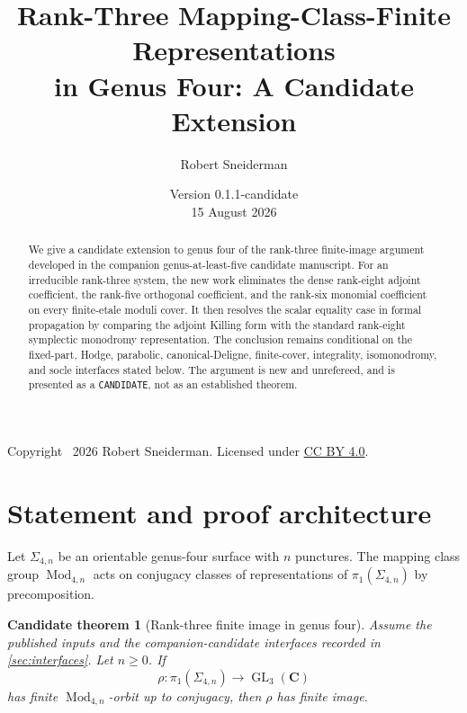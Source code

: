 \documentclass[11pt]{article}
\title{Rank-Three Mapping-Class-Finite Representations\\
in Genus Four: A Candidate Extension}
\author{Robert Sneiderman}
\date{Version 0.1.1-candidate\\15 August 2026}
\newtheorem{candidate}[theorem]{Candidate theorem}
\theoremstyle{definition}
\newcommand{\C}{\mathbf C}
\newcommand{\Mod}{\operatorname{Mod}}
\newcommand{\GL}{\operatorname{GL}}
\begin{document}
\maketitle

\begin{abstract}
We give a candidate extension to genus four of the rank-three
finite-image argument developed in the companion genus-at-least-five
candidate manuscript.  For an irreducible rank-three system, the new work
eliminates the dense rank-eight adjoint coefficient, the rank-five
orthogonal coefficient, and the rank-six monomial coefficient on every
finite-etale moduli cover.  It then resolves the scalar equality case in
formal propagation by comparing the adjoint Killing form with the standard
rank-eight symplectic monodromy representation.  The conclusion remains
conditional on the fixed-part, Hodge, parabolic, canonical-Deligne,
finite-cover, integrality, isomonodromy, and socle interfaces stated below.
The argument is new and unrefereed, and is presented as a
\texttt{CANDIDATE}, not as an established theorem.
\end{abstract}

\begin{center}
\end{center}

\begin{center}
\small Copyright \textcopyright\ 2026 Robert Sneiderman.  Licensed under
\href{https://creativecommons.org/licenses/by/4.0/}{CC BY 4.0}.
\end{center}

\tableofcontents

\section{Statement and proof architecture}\label{sec:statement}

Let $\Sigma_{4,n}$ be an orientable genus-four surface with $n$ punctures.
The mapping class group $\Mod_{4,n}$ acts on conjugacy classes of
representations of $\pi_1(\Sigma_{4,n})$ by precomposition.

\begin{candidate}[Rank-three finite image in genus four]\label{cand:main}
Assume the published inputs and the companion-candidate interfaces recorded
in \cref{sec:interfaces}.  Let $n\ge0$.  If
\[
 \rho:\pi_1(\Sigma_{4,n})\longrightarrow\GL_3(\C)
\]
has finite $\Mod_{4,n}$-orbit up to conjugacy, then $\rho$ has finite image.
\end{candidate}
\end{document}
